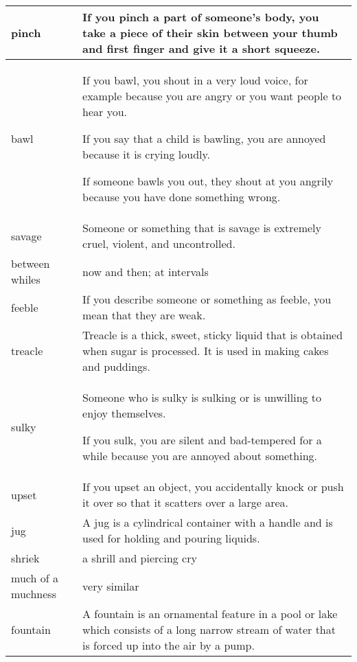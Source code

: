 \documentclass{article}
\begin{document}
\begin{center}
\begin{longtable}{|l|p{9cm}|}
\hline
pinch
&
If you pinch a part of someone's body, you take a piece of their skin between your thumb and first finger and give it a short squeeze.
\\

\hline
bawl
&
If you bawl, you shout in a very loud voice, for example because you are angry or you want people to hear you.
\par
If you say that a child is bawling, you are annoyed because it is crying loudly.
\par
If someone bawls you out, they shout at you angrily because you have done something wrong.
\\

\hline
savage
&
Someone or something that is savage is extremely cruel, violent, and uncontrolled.
\\

\hline
between whiles
&
now and then; at intervals
\\

\hline
feeble
&
If you describe someone or something as feeble, you mean that they are weak.
\\

\hline
treacle
&
Treacle is a thick, sweet, sticky liquid that is obtained when sugar is processed. It is used in making cakes and puddings.
\\

\hline
sulky
&
Someone who is sulky is sulking or is unwilling to enjoy themselves.
\par
If you sulk, you are silent and bad-tempered for a while because you are annoyed about something.
\\

\hline
upset
&
If you upset an object, you accidentally knock or push it over so that it scatters over a large area.
\\

\hline
jug
&
A jug is a cylindrical container with a handle and is used for holding and pouring liquids.
\\

\hline
shriek
&
a shrill and piercing cry
\\

\hline
much of a muchness
&
very similar
\\

\hline
fountain
&
A fountain is an ornamental feature in a pool or lake which consists of a long narrow stream of water that is forced up into the air by a pump.
\\


\end{longtable}
\end{center}
\end{document}
